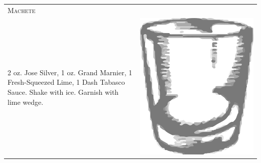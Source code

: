 \documentclass{article}
\begin{document}
\begin{tabular}{p{2in} p{0.5in}}
  \multicolumn{2}{p{3in}}{\centering\Huge\textsc{Machete}} \\ 
  
   \vspace{-0.1in}2 oz. Jose Silver, 1 oz. Grand Marnier, 1 Fresh-Squeezed
    Lime, 1 Dash Tabasco Sauce. Shake with ice. Garnish with lime
    wedge. &  \vspace{-0.1in} \includegraphics{rocks_glass.png}
\end{tabular}
\end{document}
